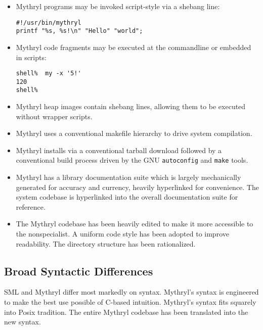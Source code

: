 \begin{itemize}

\item Mythryl programs may be invoked script-style via a shebang line:
\begin{verbatim}
#!/usr/bin/mythryl
printf "%s, %s!\n" "Hello" "world";
\end{verbatim}

\item Mythryl code fragments may be executed at the commandline or embedded in scripts:
\begin{verbatim}
shell%  my -x '5!'
120
shell%
\end{verbatim}

\item Mythryl heap images contain shebang lines, allowing them to be executed without 
wrapper scripts.

\item Mythryl uses a conventional makefile hierarchy to drive system compilation.

\item Mythryl installs via a conventional tarball download followed by a conventional 
build process driven by the {\sc GNU} {\tt autoconfig} and {\tt make} tools.

\item Mythryl has a library documentation suite which is largely mechanically generated 
for accuracy and currency, heavily hyperlinked for convenience.  The system codebase 
is hyperlinked into the overall documentation suite for reference.

\item The Mythryl codebase has been heavily edited to make it more accessible to the nonspecialist. 
A uniform code style has been adopted to improve readability. The directory structure has been 
rationalized.

\end{itemize}

\cutend*


\subsection{Broad Syntactic Differences}

{\sc SML} and Mythryl differ most markedly on syntax.  Mythryl's syntax is 
engineered to make the best use possible of C-based intuition. 
Mythryl's syntax fits squarely into Posix tradition.  The entire Mythryl 
codebase has been translated into the new syntax. 

